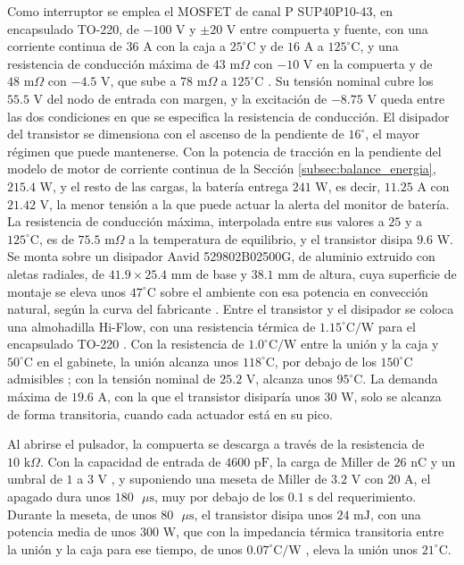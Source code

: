 \documentclass[../../General.tex]{subfiles}
\begin{document}
Como interruptor se emplea el MOSFET de canal P SUP40P10-43, en encapsulado TO-220, de $-100\text{ V}$ y $\pm 20\text{ V}$ entre compuerta y fuente, con una corriente continua de $36\text{ A}$ con la caja a $25^\circ\text{C}$ y de $16\text{ A}$ a $125^\circ\text{C}$, y una resistencia de conducción máxima de $43\text{ m}\Omega$ con $-10\text{ V}$ en la compuerta y de $48\text{ m}\Omega$ con $-4.5\text{ V}$, que sube a $78\text{ m}\Omega$ a $125^\circ\text{C}$ \citep{vishay_sup40p10}. Su tensión nominal cubre los $55.5\text{ V}$ del nodo de entrada con margen, y la excitación de $-8.75\text{ V}$ queda entre las dos condiciones en que se especifica la resistencia de conducción. El disipador del transistor se dimensiona con el ascenso de la pendiente de $16^\circ$, el mayor régimen que puede mantenerse. Con la potencia de tracción en la pendiente del modelo de motor de corriente continua de la Sección \ref{subsec:balance_energia}, $215.4\text{ W}$, y el resto de las cargas, la batería entrega $241\text{ W}$, es decir, $11.25\text{ A}$ con $21.42\text{ V}$, la menor tensión a la que puede actuar la alerta del monitor de batería. La resistencia de conducción máxima, interpolada entre sus valores a $25$ y a $125^\circ\text{C}$, es de $75.5\text{ m}\Omega$ a la temperatura de equilibrio, y el transistor disipa $9.6\text{ W}$. Se monta sobre un disipador Aavid 529802B02500G, de aluminio extruido con aletas radiales, de $41.9 \times 25.4\text{ mm}$ de base y $38.1\text{ mm}$ de altura, cuya superficie de montaje se eleva unos $47^\circ\text{C}$ sobre el ambiente con esa potencia en convección natural, según la curva del fabricante \citep{aavid_heatsinks}. Entre el transistor y el disipador se coloca una almohadilla Hi-Flow, con una resistencia térmica de $1.15^\circ\text{C/W}$ para el encapsulado TO-220 \citep{aavid_heatsinks}. Con la resistencia de $1.0^\circ\text{C/W}$ entre la unión y la caja \citep{vishay_sup40p10} y $50^\circ\text{C}$ en el gabinete, la unión alcanza unos $118^\circ\text{C}$, por debajo de los $150^\circ\text{C}$ admisibles \citep{vishay_sup40p10}; con la tensión nominal de $25.2\text{ V}$, alcanza unos $95^\circ\text{C}$. La demanda máxima de $19.6\text{ A}$, con la que el transistor disiparía unos $30\text{ W}$, solo se alcanza de forma transitoria, cuando cada actuador está en su pico.

Al abrirse el pulsador, la compuerta se descarga a través de la resistencia de $10\text{ k}\Omega$. Con la capacidad de entrada de $4600\text{ pF}$, la carga de Miller de $26\text{ nC}$ y un umbral de $1$ a $3\text{ V}$ \citep{vishay_sup40p10}, y suponiendo una meseta de Miller de $3.2\text{ V}$ con $20\text{ A}$, el apagado dura unos $180\text{ }\mu\text{s}$, muy por debajo de los $0.1\text{ s}$ del requerimiento. Durante la meseta, de unos $80\text{ }\mu\text{s}$, el transistor disipa unos $24\text{ mJ}$, con una potencia media de unos $300\text{ W}$, que con la impedancia térmica transitoria entre la unión y la caja para ese tiempo, de unos $0.07^\circ\text{C/W}$ \citep{vishay_sup40p10}, eleva la unión unos $21^\circ\text{C}$.
\end{document}
